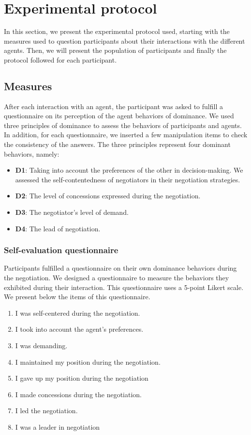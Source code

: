 \documentclass[10pt, a4paper, twocolumn]{article} %
\begin{document}
	\section{Experimental protocol}
	\label{sec:procedure}
	In this section, we present the experimental protocol used, starting with the measures used to question participants about their interactions with the different agents. Then, we will present the population of participants and finally the protocol followed for each participant. 
	
	\subsection{Measures}
	After each interaction with an agent, the participant was asked to fulfill a questionnaire on its perception of the agent behaviors of dominance.
	We used three principles of dominance to assess the behaviors of participants and agents. In addition, for each questionnaire, we inserted a few manipulation items to check the consistency of the answers.  The three principles represent four dominant behaviors, namely:
	\begin{itemize}
		\item \textbf{D1}: Taking into account the preferences of the other in decision-making. We assessed the self-contentedness of negotiators in their negotiation strategies. 
		\item \textbf{D2}: The level of concessions expressed during the negotiation.
		\item \textbf{D3}: The negotiator's level of demand.
		\item \textbf{D4}: The lead of negotiation.
	\end{itemize}
	
	\subsubsection{Self-evaluation questionnaire}
	 Participants fulfilled a questionnaire on their own dominance behaviors during the negotiation. We designed a questionnaire to measure the behaviors they exhibited during their interaction. This questionnaire uses a 5-point Likert scale. We present below the items of this questionnaire. 
	 \begin{enumerate}
		 \item I was self-centered during the negotiation.
		 \item I took into account the agent's preferences.
		 \item I was demanding.
		 \item I maintained my position during the negotiation.
		 \item I gave up my position during the negotiation
		 \item I made concessions during the negotiation.	
		 \item I led the negotiation.
		 \item I was a leader in negotiation
	\end{enumerate}
	
\end{document}
